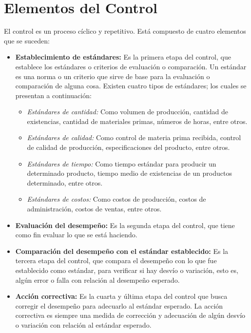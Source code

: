 \documentclass[12pt,letterpaper]{book}
\begin{document}
\section{Elementos del Control}
El control es un proceso cíclico y repetitivo. Está compuesto de cuatro elementos que se suceden:
\begin{itemize}
\item \textbf{Establecimiento de estándares:} Es la primera etapa del control, que establece los estándares o criterios de evaluación o comparación. Un estándar es una norma o un criterio que sirve de base para la evaluación o comparación de alguna cosa. Existen cuatro tipos de estándares; los cuales se presentan a continuación:
\begin{itemize}
\item \textit{Estándares de cantidad:} Como volumen de producción, cantidad de existencias, cantidad de materiales primas, números de horas, entre otros.
\item \textit{Estándares de calidad:} Como control de materia prima recibida, control de calidad de producción, especificaciones del producto, entre otros.
\item \textit{Estándares de tiempo:} Como tiempo estándar para producir un determinado producto, tiempo medio de existencias de un productos determinado, entre otros.
\item \textit{Estándares de costos:} Como costos de producción, costos de administración, costos de ventas, entre otros.
\end{itemize}
\item \textbf{Evaluación del desempeño:} Es la segunda etapa del control, que tiene como fin evaluar lo que se está haciendo.
\item \textbf{Comparación del desempeño con el estándar establecido:} Es la tercera etapa del control, que compara el desempeño con lo que fue establecido como estándar, para verificar si hay desvío o variación, esto es, algún error o falla con relación al desempeño esperado.
\item \textbf{Acción correctiva:} Es la cuarta y última etapa del control que busca corregir el desempeño para adecuarlo al estándar esperado. La acción correctiva es siempre una medida de corrección y adecuación de algún desvío o variación con relación al estándar esperado.
\end{itemize}
\end{document}
